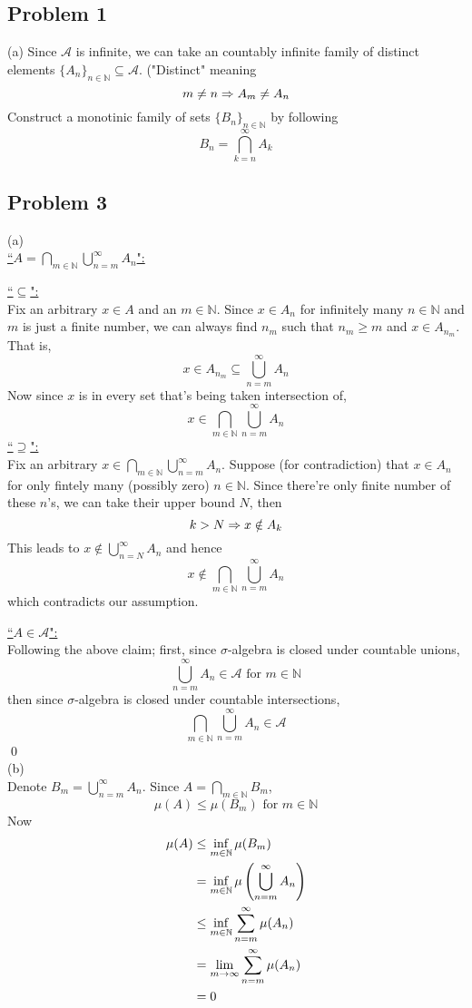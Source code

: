 \documentclass[12pt,a4paper]{article}
\newcommand{\ra}[1]{\ifnum #1=1\rightarrow\fi\ifnum #1=2\Rightarrow\fi\ifnum #1=3\Rrightarrow\fi\ifnum #1=4\rightrightarrows\fi\ifnum #1=5\rightleftarrows\fi\ifnum #1=6\mapsto\fi\ifnum #1=7\iffalse\fi\fi\ifnum #1=8\twoheadrightarrow\fi\ifnum #1=9\rightharpoonup\fi\ifnum #1=0\rightharpoondown\fi}
\newcommand{\claim}[1]{\underline{``{#1}":}}
\renewcommand{\l}{\left}\renewcommand{\r}{\right}
\newcommand{\SUM}[2]{\sum\limits_{#1}^{#2}}
\newcommand{\CUP}[2]{\bigcup\limits_{#1}^{#2}}
\newcommand{\CAP}[2]{\bigcap\limits_{#1}^{#2}}
\newcommand{\N}{\mathbb N}%
\begin{document}
\subsection*{Problem 1}
(a) Since $\mathcal A$ is infinite, we can take an countably infinite family of distinct elements $\{A_n\}_{n\in\N} \subseteq \mathcal A$. ("Distinct" meaning 
$$m \neq n \ra2 A_m \neq A_n$$
Construct a monotinic family of sets $\{B_n\}_{n\in\N}$ by following
$$B_n = \CAP{k = n}\infty A_k$$



\newpage
\subsection*{Problem 3}
(a) \\
\claim{$A = \CAP{m \in \N}{} \CUP{n = m}{\infty} A_n$} \\
\begin{adjustwidth}{1cm}{}
\claim{$\subseteq$}\\
Fix an arbitrary $x\in A$ and an $m\in\N$. Since $x \in A_n$ for infinitely many $n\in \N$ and $m$ is just a finite number, we can always find $n_m$ such that $n_m \geq m$ and $x \in A_{n_m}$. That is,
$$x \in A_{n_m} \subseteq \CUP{n = m}\infty A_n$$
Now since $x$ is in every set that's being taken intersection of, 
$$x \in \CAP{m\in\N}{} \CUP{n = m}\infty A_n$$
\claim{$\supseteq$}\\
Fix an arbitrary $x\in \CAP{m \in \N}{} \CUP{n = m}{\infty} A_n$. Suppose (for contradiction) that $x \in A_n$ for only fintely many (possibly zero) $n\in \N$. Since there're only finite number of these $n$'s, we can take their upper bound $N$, then
$$k > N \ra2 x \notin A_k$$
This leads to $x \notin \CUP{n = N}\infty A_n$ and hence 
$$x \notin\CAP{m\in\N}{} \CUP{n = m}\infty A_n$$ which contradicts our assumption. \\
\end{adjustwidth}
\claim{$A \in \mathcal A$}\\
Following the above claim; first, since $\sigma$-algebra is closed under countable unions, 
$$\CUP{n=m}\infty A_n \in \mathcal A \mbox{ for } m \in \N$$
then since $\sigma$-algebra is closed under countable intersections, 
$$\CAP{m\in\N}{}\CUP{n=m}\infty A_n \in \mathcal A$$
\qed \\
(b) \\
Denote $B_m = \CUP{n=m}\infty A_n$. Since $A = \CAP{m \in \N}{} B_m$, 
$$\mu(A) \leq \mu(B_m) \mbox{ for } m \in \N$$
Now 
\begin{align*}
	\mu(A) & \leq  \inf_{m\in\N} \mu(B_m) \\
           & = \inf_{m\in\N} \mu\l(\CUP{n = m}\infty A_n\r) \\
           & \leq \inf_{m\in\N} \SUM{n = m}\infty \mu(A_n) \\
           & = \lim_{m \ra1 \infty} \SUM{n=m}\infty \mu(A_n) \\
           & = 0
\end{align*}
\end{document}

